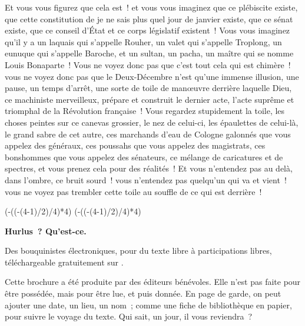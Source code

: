 \documentclass[french,twoside]{book} %
\newcommand\chapterclose{} %
\def\truncdiv#1#2{((#1-(#2-1)/2)/#2)}
\def\moduloop#1#2{(#1-\truncdiv{#1}{#2}*#2)}
\def\modulo#1#2{\number\numexpr\moduloop{#1}{#2}\relax}
\begin{document}
Et vous vous figurez que cela est ! et vous vous imaginez que ce plébiscite existe, que cette constitution de je ne sais plus quel jour de janvier existe, que ce sénat existe, que ce conseil d’État et ce corps législatif existent ! Vous vous imaginez qu’il y a un laquais qui s’appelle Rouher, un valet qui s’appelle Troplong, un eunuque qui s’appelle Baroche, et un sultan, un pacha, un maître qui se nomme Louis Bonaparte ! Vous ne voyez donc pas que c’est tout cela qui est chimère ! vous ne voyez donc pas que le Deux-Décembre n’est qu’une immense illusion, une pause, un temps d’arrêt, une sorte de toile de manœuvre derrière laquelle Dieu, ce machiniste merveilleux, prépare et construit le dernier acte, l’acte suprême et triomphal de la Révolution française ! Vous regardez stupidement la toile, les choses peintes sur ce canevas grossier, le nez de celui-ci, les épaulettes de celui-là, le grand sabre de cet autre, ces marchands d’eau de Cologne galonnés que vous appelez des généraux, ces poussahs que vous appelez des magistrats, ces bonshommes que vous appelez des sénateurs, ce mélange de caricatures et de spectres, et vous prenez cela pour des réalités ! Et vous n’entendez pas au delà, dans l’ombre, ce bruit sourd ! vous n’entendez pas quelqu’un qui va et vient ! vous ne voyez pas trembler cette toile au souffle de ce qui est derrière !
\chapterclose

 


\ifbooklet
  \pagestyle{empty}
  \clearpage
  \ifnum\modulo{\value{page}}{4}=0 \hbox{}\newpage\hbox{}\newpage\fi
  \ifnum\modulo{\value{page}}{4}=1 \hbox{}\newpage\hbox{}\newpage\fi


  \hbox{}\newpage
  \ifodd\value{page}\hbox{}\newpage\fi
  {\centering\color{rubric}\bfseries\noindent\large
    Hurlus ? Qu’est-ce.\par
    \bigskip
  }
  \noindent Des bouquinistes électroniques, pour du texte libre à participations libres,
  téléchargeable gratuitement sur \href{https://hurlus.fr}{}.\par
  \bigskip
  \noindent Cette brochure a été produite par des éditeurs bénévoles.
  Elle n’est pas faite pour être possédée, mais pour être lue, et puis donnée.
  En page de garde, on peut ajouter une date, un lieu, un nom ;
  comme une fiche de bibliothèque en papier,
  pour suivre le voyage du texte. Qui sait, un jour, il vous reviendra ?
  \par
\end{document}
